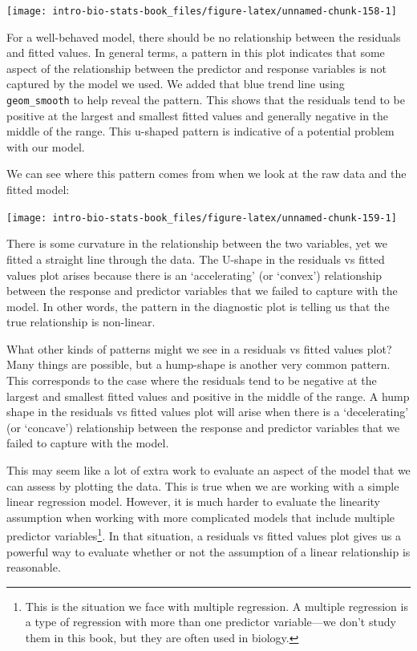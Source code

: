 \documentclass[
]{book}
\begin{document}
\begin{center}\texttt{[image: intro-bio-stats-book\_files/figure-latex/unnamed-chunk-158-1]} \end{center}

For a well-behaved model, there should be no relationship between the residuals and fitted values. In general terms, a pattern in this plot indicates that some aspect of the relationship between the predictor and response variables is not captured by the model we used. We added that blue trend line using \texttt{geom\_smooth} to help reveal the pattern. This shows that the residuals tend to be positive at the largest and smallest fitted values and generally negative in the middle of the range. This u-shaped pattern is indicative of a potential problem with our model.

We can see where this pattern comes from when we look at the raw data and the fitted model:

\begin{center}\texttt{[image: intro-bio-stats-book\_files/figure-latex/unnamed-chunk-159-1]} \end{center}

There is some curvature in the relationship between the two variables, yet we fitted a straight line through the data. The U-shape in the residuals vs fitted values plot arises because there is an `accelerating' (or `convex') relationship between the response and predictor variables that we failed to capture with the model. In other words, the pattern in the diagnostic plot is telling us that the true relationship is non-linear.

What other kinds of patterns might we see in a residuals vs fitted values plot? Many things are possible, but a hump-shape is another very common pattern. This corresponds to the case where the residuals tend to be negative at the largest and smallest fitted values and positive in the middle of the range. A hump shape in the residuals vs fitted values plot will arise when there is a `decelerating' (or `concave') relationship between the response and predictor variables that we failed to capture with the model.

This may seem like a lot of extra work to evaluate an aspect of the model that we can assess by plotting the data. This is true when we are working with a simple linear regression model. However, it is much harder to evaluate the linearity assumption when working with more complicated models that include multiple predictor variables\footnote{This is the situation we face with multiple regression. A multiple regression is a type of regression with more than one predictor variable---we don't study them in this book, but they are often used in biology.}. In that situation, a residuals vs fitted values plot gives us a powerful way to evaluate whether or not the assumption of a linear relationship is reasonable.
\end{document}
